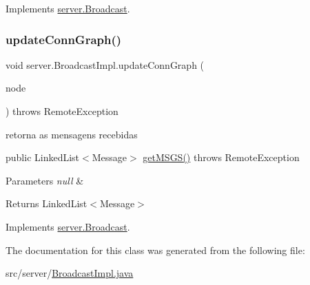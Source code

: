 Implements \hyperlink{interfaceserver_1_1_broadcast_a1fe00d7724fded04758454fcd1e61615}{server.\+Broadcast}.

\mbox{\label{classserver_1_1_broadcast_impl_abf98d794cdcf469b48cae2fbb23f1479}} 
\subsubsection{\texorpdfstring{update\+Conn\+Graph()}{updateConnGraph()}}
{\footnotesize\ttfamily void server.\+Broadcast\+Impl.\+update\+Conn\+Graph (\begin{DoxyParamCaption}\item[{\hyperlink{classstructure_1_1_group_node}{Group\+Node}}]{node }\end{DoxyParamCaption}) throws Remote\+Exception}



retorna as mensagens recebidas 

public Linked\+List$<$\+Message$>$ \hyperlink{classserver_1_1_broadcast_impl_aecb6cd49880c2e908b1ba3d17c454ced}{get\+M\+S\+G\+S()} throws Remote\+Exception 
\begin{DoxyParams}{Parameters}
{\em null} & \\
\hline
\end{DoxyParams}
\begin{DoxyReturn}{Returns}
Linked\+List$<$\+Message$>$ 
\end{DoxyReturn}


Implements \hyperlink{interfaceserver_1_1_broadcast_a9efddebebb91a7da6bc0ecddcc7a32e6}{server.\+Broadcast}.



The documentation for this class was generated from the following file\+:\begin{DoxyCompactItemize}
\item 
src/server/\hyperlink{_broadcast_impl_8java}{Broadcast\+Impl.\+java}\end{DoxyCompactItemize}
